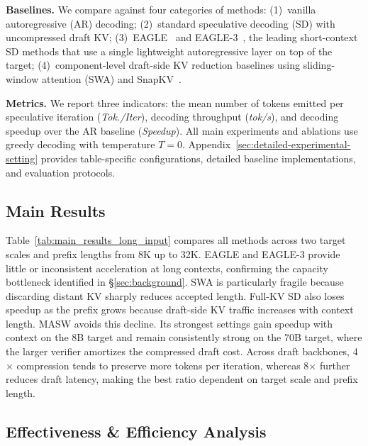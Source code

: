\textbf{Baselines.}
We compare against four categories of methods:
(1)~vanilla autoregressive (AR) decoding;
(2)~standard speculative decoding (SD) with uncompressed draft KV;
(3)~EAGLE~\citep{pmlr-v235-li24bt} and EAGLE-3~\citep{li2025eagle3scalinginferenceacceleration}, the leading short-context SD methods that use a single lightweight autoregressive layer on top of the target;
(4)~component-level draft-side KV reduction baselines using sliding-window attention (SWA) and SnapKV~\citep{li2024snapkv}.

\textbf{Metrics.}
We report three indicators: the mean number of tokens emitted per speculative iteration (\textit{Tok./Iter}), decoding throughput (\textit{tok/s}), and decoding speedup over the AR baseline (\textit{Speedup}).
All main experiments and ablations use greedy decoding with temperature $T{=}0$.
Appendix~\ref{sec:detailed-experimental-setting} provides table-specific configurations, detailed baseline implementations, and evaluation protocols.

\subsection{Main Results}
\label{subsec:main_results}

Table~\ref{tab:main_results_long_input} compares all methods across two target scales and prefix lengths from 8K up to 32K.
EAGLE and EAGLE-3 provide little or inconsistent acceleration at long contexts, confirming the capacity bottleneck identified in \S\ref{sec:background}.
SWA is particularly fragile because discarding distant KV sharply reduces accepted length.
Full-KV SD also loses speedup as the prefix grows because draft-side KV traffic increases with context length.
MASW avoids this decline.
Its strongest settings gain speedup with context on the 8B target and remain consistently strong on the 70B target, where the larger verifier amortizes the compressed draft cost.
Across draft backbones, 4$\times$ compression tends to preserve more tokens per iteration, whereas 8$\times$ further reduces draft latency, making the best ratio dependent on target scale and prefix length.

\subsection{Effectiveness \& Efficiency Analysis}
\label{subsec:efficiency_analysis}
\label{subsec:performance_analysis}

